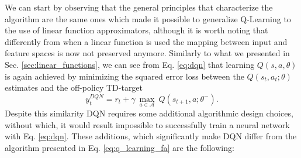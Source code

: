 We can start by observing that the general principles that characterize the algorithm are the same ones which made it possible to generalize Q-Learning to the use of linear function approximators, although it is worth noting that differently from when a linear function is used the mapping between input and feature spaces is now not preserved anymore. Similarly to what we presented in Sec. \ref{sec:linear_functions}, we can see from Eq. \ref{eq:dqn} that learning $Q(s,a,\theta)$ is again achieved by minimizing the squared error loss between the $Q(s_t,a_t;\theta)$ estimates and the off-policy TD-target
\begin{equation}
    y^{DQN}_{t} = r_{t} + \gamma \: \underset{a\in \mathcal{A}}{\max}\: Q(s_{t+1}, a; \theta^{-}).
\label{eq:dqn_td}
\end{equation}
Despite this similarity DQN requires some additional algorithmic design choices, without which, it would result impossible to successfully train a neural network with Eq. \ref{eq:dqn}. These additions, which significantly make DQN differ from the algorithm presented in Eq. \ref{eq:q_learning_fa} are the following:
